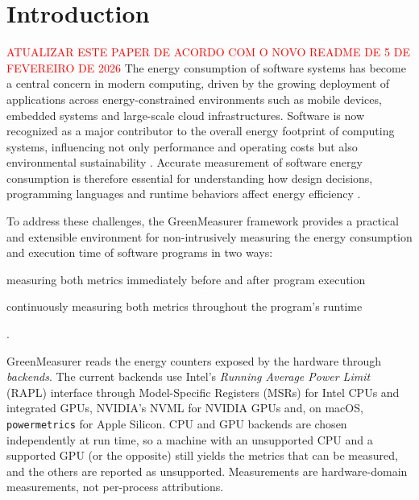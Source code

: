 \section{Introduction}

\textcolor{red}{ATUALIZAR ESTE PAPER DE ACORDO COM O NOVO README DE 5 DE FEVEREIRO DE 2026}
The energy consumption of software systems has become a central concern in modern computing, driven by the growing deployment of applications across energy-constrained environments such as mobile devices, embedded systems and large-scale cloud infrastructures. Software is now recognized as a major contributor to the overall energy footprint of computing systems, influencing not only performance and operating costs but also environmental sustainability \cite{10.1007/s10664-013-9276-6, 10.1145/3154384}. Accurate measurement of software energy consumption is therefore essential for understanding how design decisions, programming languages and runtime behaviors affect energy efficiency \cite{10.1145/2168836.2168841, 10.1145/2568225.2568297}. 

To address these challenges, the GreenMeasurer framework provides a practical and extensible environment for non-intrusively measuring the energy consumption and execution time of software programs in two ways: \begin{enumerate*}[label=(\arabic*), itemjoin={{; }}, itemjoin*={{; and }}]
    \item measuring both metrics immediately before and after program execution
    \item continuously measuring both metrics throughout the program's runtime
\end{enumerate*}.


GreenMeasurer reads the energy counters exposed by the hardware through \emph{backends}. The current backends use Intel's \textit{Running Average Power Limit} (RAPL) \cite{intel-rapl-reporting, 10.1145/3177754} interface through Model-Specific Registers (MSRs) for Intel CPUs and integrated GPUs, NVIDIA's NVML for NVIDIA GPUs and, on macOS, \texttt{powermetrics} for Apple Silicon. CPU and GPU backends are chosen independently at run time, so a machine with an unsupported CPU and a supported GPU (or the opposite) still yields the metrics that can be measured, and the others are reported as unsupported. Measurements are hardware-domain measurements, not per-process attributions.

